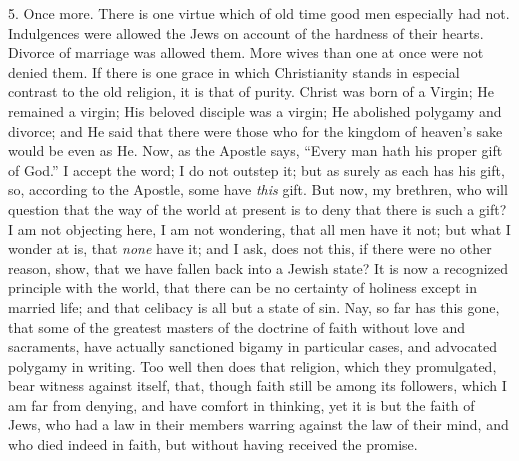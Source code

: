 5. Once more. There is one virtue which of old time good men
especially had not. Indulgences were allowed the Jews on account of
the hardness of their hearts. Divorce of marriage was allowed them.
More wives than one at once were not denied them. If there is one
grace in which Christianity stands in especial contrast to the old
religion, it is that of purity. Christ was born of a Virgin; He
remained a virgin; His beloved disciple was a virgin; He abolished
polygamy and divorce; and He said that there were those who for the
kingdom of heaven's sake would be even as He. Now, as the Apostle
says, ``Every man hath his proper gift of God.'' I accept the
word; I do not outstep it; but as surely as each has his gift, so,
according to the Apostle, some have \emph{this} gift. But now, my
brethren, who will question that the way of the world at present is to
deny that there is such a gift? I am not objecting here, I am not
wondering, that all men have it not; but what I wonder at is, that \emph{none} have it; and I ask, does not this, if there were no other reason,
show, that we have fallen back into a Jewish state? It is now a
recognized principle with the world, that there can be no certainty of
holiness except in married life; and that celibacy is all but a state
of sin. Nay, so far has this gone, that some of the greatest masters
of the doctrine of faith without love and sacraments, have actually
sanctioned bigamy in particular cases, and advocated polygamy in
writing. Too well then does that religion, which they promulgated,
bear witness against itself, that, though faith still be among its
followers, which I am far from denying, and have comfort in thinking,
yet it is but the faith of Jews, who had a law in their members
warring against the law of their mind, and who died indeed in faith,
but without having received the promise.

